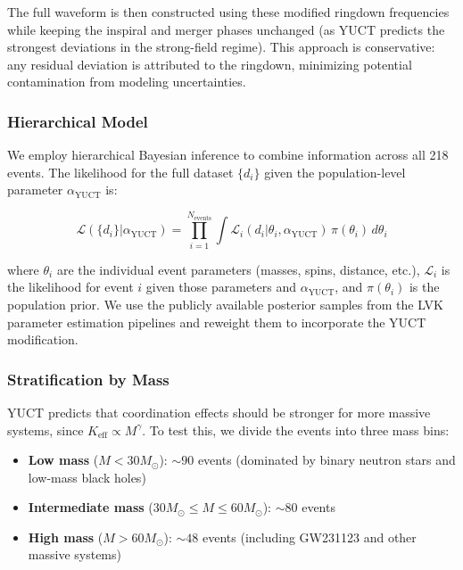 \documentclass[12pt,a4paper]{article}
\theoremstyle{remark}
\newcommand{\Keff}{K_{\mathrm{eff}}}
\begin{document}
	The full waveform is then constructed using these modified ringdown frequencies while keeping the inspiral and merger phases unchanged (as YUCT predicts the strongest deviations in the strong-field regime). This approach is conservative: any residual deviation is attributed to the ringdown, minimizing potential contamination from modeling uncertainties.
	
	\subsubsection{Hierarchical Model}
	
	We employ hierarchical Bayesian inference to combine information across all 218 events. The likelihood for the full dataset $\{d_i\}$ given the population-level parameter $\alpha_{\text{YUCT}}$ is:
	
	\begin{equation}
		\mathcal{L}(\{d_i\} | \alpha_{\text{YUCT}}) = \prod_{i=1}^{N_{\text{events}}} \int \mathcal{L}_i(d_i | \theta_i, \alpha_{\text{YUCT}}) \, \pi(\theta_i) \, d\theta_i
		\label{eq:hierarchical}
	\end{equation}
	
	where $\theta_i$ are the individual event parameters (masses, spins, distance, etc.), $\mathcal{L}_i$ is the likelihood for event $i$ given those parameters and $\alpha_{\text{YUCT}}$, and $\pi(\theta_i)$ is the population prior. We use the publicly available posterior samples from the LVK parameter estimation pipelines  and reweight them to incorporate the YUCT modification.
	
	\subsubsection{Stratification by Mass}
	
	YUCT predicts that coordination effects should be stronger for more massive systems, since $\Keff \propto M^{\gamma}$. To test this, we divide the events into three mass bins:
	
	\begin{itemize}
		\item \textbf{Low mass} ($M < 30 M_\odot$): $\sim 90$ events (dominated by binary neutron stars and low-mass black holes)
		\item \textbf{Intermediate mass} ($30 M_\odot \le M \le 60 M_\odot$): $\sim 80$ events
		\item \textbf{High mass} ($M > 60 M_\odot$): $\sim 48$ events (including GW231123 and other massive systems)
	\end{itemize}
	
\end{document}
